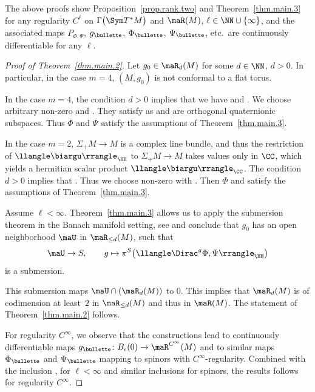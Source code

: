 \begin{Remark}\label{rem.regularity}
The above proofs show Proposition~\ref{prop.rank.two} and Theorem~\ref{thm.main.3} for any regularity $C^\ell$ on $\Gamma\bigl(\Sym T^*M\bigr)$ and $\maR(M)$, $\ell\in \NN\cup\{\infty\}$, and the associated maps $P_{\Phi,\Psi}$, $g_\bullette$, $\Phi_\bullette$, $\Psi_\bullette$, etc.\ are continuously differentiable for any $\ell$.
\end{Remark}

\begin{proof}[Proof of Theorem~\ref{thm.main.2}]
Let $g_0\in \maR_d(M)$ for some $d\in \NN$, $d>0$.
In particular, in the case $m=4$, $(M,g_0)$ is not conformal to a flat torus.

In the case $m=4$, the condition $d>0$ implies that we have  and . We choose arbitrary non-zero  and . They satisfy  as  and  are orthogonal quaternionic subspaces. Thus $\Phi$ and $\Psi$ satisfy the assumptions of Theorem~\ref{thm.main.3}.

In the case $m=2$, $\Sigma_+M\to M$ is a complex line bundle, and thus the restriction of $\llangle\biargu\rrangle_\HH$ to $\Sigma_+M\to M$ takes values only in $\CC$, which yields a hermitian scalar product $\llangle\biargu\rrangle_\CC$. The condition $d>0$ implies that . Thus we choose non-zero  with . Then $\Phi$ and  satisfy the assumptions of Theorem~\ref{thm.main.3}.

Assume $\ell<\infty$. Theorem~\ref{thm.main.3} allows us to apply the submersion theorem in the Banach manifold setting, see \cite[Theorem~3.5.4]{abraham.marsden.ratiu:1988} and conclude that $g_0$ has an open neighborhood $\maU$ in $\maR_{\leq d}(M)$,
such that
\begin{align*}
\maU\to S,\qquad g\mapsto
\pi^S\bigl(\llangle \Dirac^g \Phi, \Psi \rrangle_\HH\bigr)
\end{align*}
is a submersion.

This submersion maps $\maU\cap(\maR_d(M))$ to $0$. This implies that $\maR_d(M)$ is of codimension at least~$2$ in $\maR_{\leq d}(M)$ and thus in $\maR(M)$. The statement of Theorem~\ref{thm.main.2} follows.

For regularity $C^\infty$, we observe that the constructions lead to continuously differentiable maps
$g_\bullette \colon B_\epsilon(0)\to \maR^{C^\infty}(M)$
and to similar maps $\Phi_\bullette$ and $\Psi_\bullette$ mapping to spinors with $C^\infty$-regularity. Combined with the inclusion , for $\ell<\infty$ and similar inclusions for spinors, the results follows for regularity $C^\infty$.
\end{proof}

